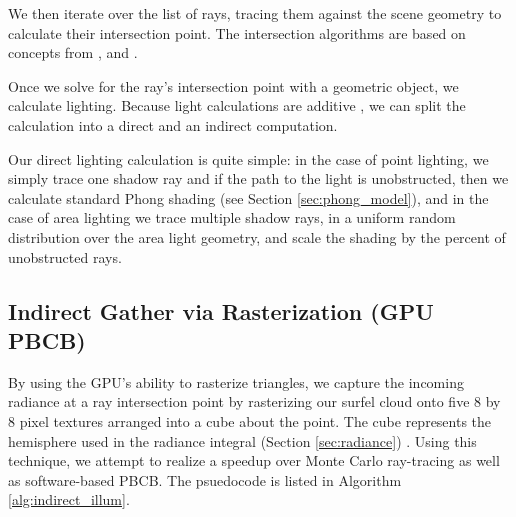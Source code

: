 We then iterate over the list of rays, tracing them against the scene geometry to calculate their intersection point. The intersection algorithms are based on concepts from \cite{bib:pbr}, and \cite{verth:2008}.

Once we solve for the ray's intersection point with a geometric object, we calculate lighting. Because light calculations are additive \cite{bib:pbr}, we can split the calculation into a direct and an indirect computation.

Our direct lighting calculation is quite simple: in the case of point lighting, we simply trace one shadow ray \cite{bib:pbr} and if the path to the light is unobstructed, then we calculate standard Phong shading (see Section \ref{sec:phong_model}), and in the case of area lighting we trace multiple shadow rays, in a uniform random distribution over the area light geometry, and scale the shading by the percent of unobstructed rays.

%

\subsection{Indirect Gather via Rasterization (GPU PBCB)}
\label{sec:indirect}
By using the GPU's ability to rasterize triangles, we capture the incoming radiance at a ray intersection point by rasterizing our surfel cloud onto five 8 by 8 pixel textures arranged into a cube about the point. The cube represents the hemisphere used in the radiance integral (Section \ref{sec:radiance}) . Using this technique, we attempt to realize a speedup over Monte Carlo ray-tracing as well as software-based PBCB. The psuedocode is listed in Algorithm \ref{alg:indirect_illum}.

